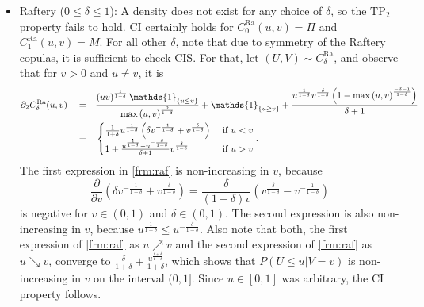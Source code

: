 \documentclass{article}
\def\1{\mathds{1}} %
\def\of#1{\left(#1\right)} %
\def\inbrackets#1{\of{#1}} %
\def\setof#1{\left\{#1\right\}} %
\newcommand{\TP}{\mathrm{TP_2}}
\begin{document}
\begin{itemize}
    Hence, the $\TP$ property fails to hold for $\theta \in (2, \infty)$.
    For $\theta\in[1, 2]$, our numerical checks indicate that the copula family is $\TP$.
    \item Raftery ($0\leq \delta\leq 1$):
    A density does not exist for any choice of $\delta$, so the $\TP$ property fails to hold.
    CI certainly holds for $C_{0}^{\text{Ra}}(u,v)= \Pi$ and $C_{1}^{\text{Ra}}(u,v)=M$.
    For all other $\delta$, note that due to symmetry of the Raftery copulas, it is sufficient to check CIS.
    For that, let $(U,V)\sim C_{\delta}^{\text{Ra}}$, and observe that for $v>0$ and $u\neq v$, it is
    \begin{align}
        \partial_2 C_{\delta}^{\text{Ra}}(u,v)
        \quad = \quad & \frac{\left(u v\right)^{\frac{1}{1 - \delta}} \1_{\setof{u\leq v}}}{\max\left(u, v\right)^{\frac{2}{1 - \delta}}} + \1_{\setof{u \geq v}} + \frac{u^{\frac{1}{1 - \delta}} v^{\frac{\delta}{1 - \delta}} \left(1 - \max\left(u, v\right)^{\frac{- \delta - 1}{1 - \delta}}\right)}{\delta + 1} \nonumber\allowdisplaybreaks\\
        = \quad & \begin{cases}
            \frac1{1+\delta}u^{\frac{1}{1 - \delta}}\inbrackets{\delta v^{-\frac{1}{1 - \delta}} + v^{\frac{\delta}{1 - \delta}}} & \text{ if } u < v \\
            1 + \frac{u^{\frac{1}{1-\delta}} - u^{-\frac{\delta}{1-\delta}}}{\delta + 1}v^{\frac{\delta}{1-\delta}}& \text{ if } u > v
        \end{cases} \label{frm:raf}
    .\end{align}
    The first expression in \eqref{frm:raf} is non-increasing in $v$, because
    \[
        \frac{\partial}{\partial v} \inbrackets{\delta v^{-\frac{1}{1 - \delta}} + v^{\frac{\delta}{1 - \delta}}}
        = \frac{\delta}{(1-\delta)v} \inbrackets{v^{\frac{\delta}{1 - \delta}}- v^{-\frac{1}{1 - \delta} }}
    \]
    is negative for $v\in(0,1)$ and $\delta\in(0,1)$.
    The second expression is also non-increasing in $v$, because $u^{\frac{1}{1-\delta}} \leq u^{-\frac{\delta}{1-\delta}}$.
    Also note that both, the first expression of \eqref{frm:raf} as $u\nearrow v$ and the second expression of \eqref{frm:raf} as $u\searrow v$, converge to $\frac{\delta}{1+\delta} + \frac{u^{\frac{1+\delta}{1-\delta}}}{1+\delta}$, which shows that $P(U\leq u|V=v)$ is non-increasing in $v$ on the interval $(0, 1]$.
    Since $u\in[0, 1]$ was arbitrary, the CI property follows.
\end{itemize}
\end{document}
